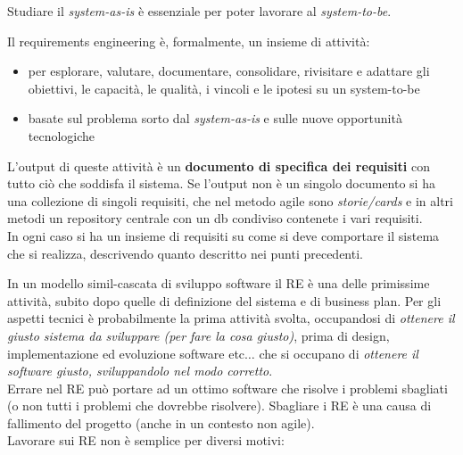 \documentclass[a4paper,12pt, oneside]{book}
\begin{document}
Studiare il \textit{system-as-is} è essenziale per poter lavorare al
\textit{system-to-be}.
\newpage
\begin{definizione}
  Il requirements engineering è, formalmente, un insieme di attività:
  \begin{itemize}
    \item per esplorare, valutare, documentare, consolidare, rivisitare e
    adattare gli obiettivi, le capacità, le qualità, i vincoli e le ipotesi su
    un \textup{system-to-be} 
    \item basate sul problema sorto dal \textit{system-as-is} e sulle nuove
    opportunità tecnologiche
  \end{itemize}
  L'output di queste attività è un \textbf{documento di specifica dei requisiti}
  con tutto ciò che soddisfa il sistema. Se l'output non è un singolo documento
  si ha una collezione di singoli requisiti, che nel metodo agile sono
  \textit{storie/cards} e in altri metodi un repository centrale con un db
  condiviso contenete i vari requisiti.\\
  In ogni caso si ha un insieme di requisiti su come si deve comportare il
  sistema che si realizza, descrivendo quanto descritto nei punti precedenti.
\end{definizione}
In un modello simil-cascata di sviluppo software il RE è una delle primissime
attività, subito dopo quelle di definizione del sistema e di business plan. Per
gli aspetti tecnici è probabilmente la prima attività svolta, occupandosi di
\textit{ottenere il giusto sistema da sviluppare (per fare la cosa giusto)},
prima di design, 
implementazione ed evoluzione software etc$\ldots$ che si occupano di
\textit{ottenere il software giusto, sviluppandolo nel modo corretto}.\\
Errare nel RE può portare ad un ottimo software che risolve i problemi sbagliati
(o non tutti i problemi che dovrebbe risolvere). Sbagliare i RE è una causa di
fallimento del progetto (anche in un contesto non agile).\\
Lavorare sui RE non è semplice per diversi motivi:
\end{document}
